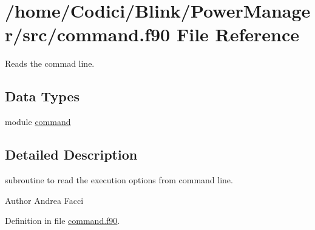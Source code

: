 \hypertarget{command_8f90}{\section{/home/\-Codici/\-Blink/\-Power\-Manager/src/command.f90 File Reference}
\label{command_8f90}
}


Reads the commad line.  


\subsection*{Data Types}
\begin{DoxyCompactItemize}
\item 
module \hyperlink{classcommand}{command}
\end{DoxyCompactItemize}


\subsection{Detailed Description}
subroutine to read the execution options from command line. \begin{DoxyAuthor}{Author}
Andrea Facci 
\end{DoxyAuthor}


Definition in file \hyperlink{command_8f90_source}{command.\-f90}.

